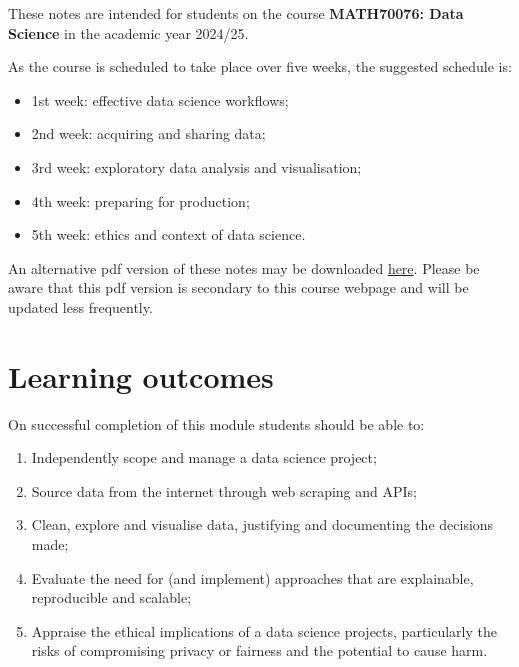 \documentclass[
  letterpaper,
  DIV=11,
  numbers=noendperiod]{scrreprt}
\providecommand{\tightlist}{%
  \setlength{\itemsep}{0pt}\setlength{\parskip}{0pt}}\usepackage{longtable,booktabs,array}
\begin{document}

These notes are intended for students on the course \textbf{MATH70076:
Data Science} in the academic year 2024/25.

As the course is scheduled to take place over five weeks, the suggested
schedule is:

\begin{itemize}
\tightlist
\item
  1st week: effective data science workflows;
\item
  2nd week: acquiring and sharing data;
\item
  3rd week: exploratory data analysis and visualisation;
\item
  4th week: preparing for production;
\item
  5th week: ethics and context of data science.
\end{itemize}

An alternative pdf version of these notes may be downloaded
\href{./Effective-Data-Science.pdf}{here}. Please be aware that this pdf
version is secondary to this course webpage and will be updated less
frequently.

\section*{Learning outcomes}\label{learning-outcomes}


On successful completion of this module students should be able to:

\begin{enumerate}
\def\labelenumi{\arabic{enumi}.}
\tightlist
\item
  Independently scope and manage a data science project;
\item
  Source data from the internet through web scraping and APIs;
\item
  Clean, explore and visualise data, justifying and documenting the
  decisions made;
\item
  Evaluate the need for (and implement) approaches that are explainable,
  reproducible and scalable;
\item
  Appraise the ethical implications of a data science projects,
  particularly the risks of compromising privacy or fairness and the
  potential to cause harm.
\end{enumerate}
\end{document}
